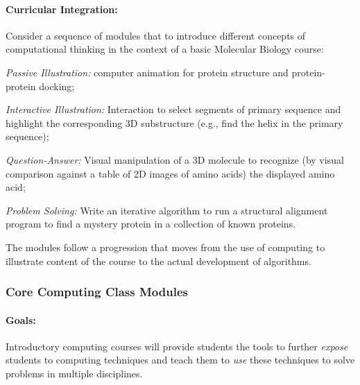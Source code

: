 
\paragraph{Curricular Integration:}
Consider a sequence of modules that to introduce different concepts of computational thinking in the context of a basic Molecular Biology course:
\begin{tightenumerate}
\item \emph{Passive Illustration:} computer animation  for protein structure and protein-protein docking; 
\item \emph{Interactive Illustration:} Interaction to select segments of primary sequence and highlight the corresponding 3D substructure (e.g., find the helix in the primary sequence);
\item \emph{Question-Answer:} Visual manipulation of a 3D molecule to recognize (by visual comparison against a table of 2D images of amino acids) the displayed amino acid;
\item \emph{Problem Solving:} Write an iterative algorithm to run a structural alignment program to find a mystery protein in a collection of known proteins.
\end{tightenumerate}
The modules follow a  progression that moves from the use of computing to illustrate content of the course to the actual development of algorithms.

\subsubsection{Core Computing Class Modules}
\paragraph{Goals:} Introductory computing courses will provide  students the tools to further \emph{expose} students to computing techniques and teach them to \emph{use} these techniques to solve problems in multiple disciplines.

